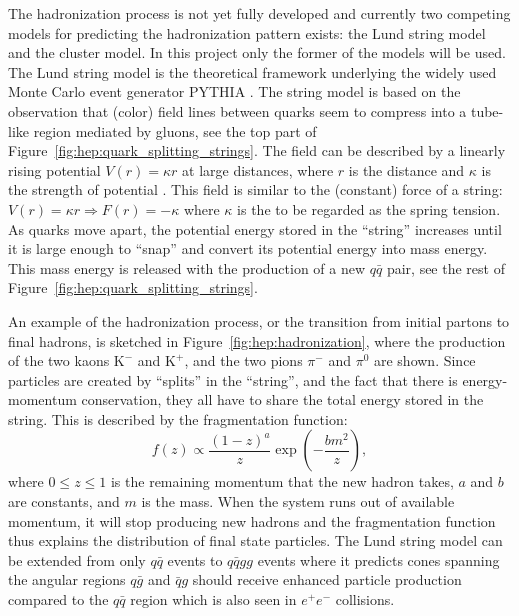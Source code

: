 \documentclass[a4paper, twoside, nobib]{tufte-book}
\newcommand{\q}[1]{``#1''}
\newcommand{\autocite}[1]{\citep{#1}}
\begin{document}
The hadronization process is not yet fully developed and currently two competing models for predicting the hadronization pattern exists: the Lund string model and the cluster model. In this project only the former of the models will be used. The Lund string model \autocite{anderssonPartonFragmentationString1983} is the theoretical framework underlying the widely used Monte Carlo event generator PYTHIA \autocite{sjostrandIntroductionPYTHIA2015}. The string model is based on the observation that (color) field lines between quarks seem to compress into a tube-like region mediated by gluons, see the top part of Figure~\ref{fig:hep:quark_splitting_strings}. The field can be described by a linearly rising potential $V(r)=\kappa r$ at large distances, where $r$ is the distance and $\kappa$ is the strength of potential \autocite{buckleyGeneralpurposeEventGenerators2011}. This field is similar to the (constant) force of a string: $V(r)=\kappa r \Rightarrow F(r) = -\kappa$ where $\kappa$ is the to be regarded as the spring tension. As quarks move apart, the potential energy stored in the \q{string} increases until it is large enough to \q{snap} and convert its potential energy into mass energy. This mass energy is released with the production of a new $q\bar{q}$ pair, see the rest of Figure~\ref{fig:hep:quark_splitting_strings}. 

An example of the hadronization process, or the transition from initial partons to final hadrons, is sketched in Figure~\ref{fig:hep:hadronization}, where the production of the two kaons $\mathrm{K}^-$ and $\mathrm{K}^+$, and the two pions $\pi^-$ and $\pi^0$ are shown. Since particles are created by \q{splits} in the \q{string}, and the fact that there is energy-momentum conservation, they all have to share the total energy stored in the string. This is described by the fragmentation function:
\begin{equation}
  f(z) \propto \frac{(1-z)^a}{z} \exp \left(- \frac{b m^2}{z} \right),
\end{equation}
where $0 \leq z \leq 1$ is the remaining momentum that the new hadron takes, $a$ and $b$ are constants, and $m$ is the mass\autocite{bierlichRopeHadronizationGeometry2016}. When the system runs out of available momentum, it will stop producing new hadrons and the fragmentation function thus explains the distribution of final state particles. The Lund string model can be extended from only $q\bar{q}$ events to $q\bar{q}gg$ events where it predicts cones spanning the angular regions $q\bar{g}$ and $\bar{q}g$ should receive enhanced particle production compared to the $q\bar{q}$ region which is also seen in $e^+e^-$ collisions\autocite{buckleyGeneralpurposeEventGenerators2011}.
\end{document}
